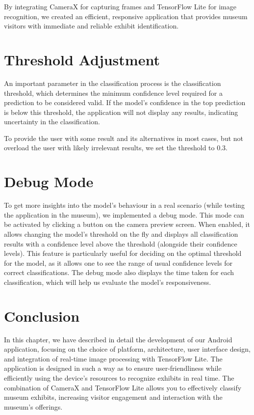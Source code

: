 By integrating CameraX for capturing frames and TensorFlow Lite for image recognition, we created an efficient, responsive application that provides museum visitors with immediate and reliable exhibit identification.

\section{Threshold Adjustment}

An important parameter in the classification process is the classification threshold, which determines the minimum confidence level required for a prediction to be considered valid. If the model's confidence in the top prediction is below this threshold, the application will not display any results, indicating uncertainty in the classification. 

To provide the user with some result and its alternatives in most cases, but not overload the user with likely irrelevant results, we set the threshold to 0.3.

\section{Debug Mode}

To get more insights into the model's behaviour in a real scenario (while testing the application in the museum), we implemented a debug mode. This mode can be activated by clicking a button on the camera preview screen. When enabled, it allows changing the model's threshold on the fly and displays all classification results with a confidence level above the threshold (alongside their confidence levels). This feature is particularly useful for deciding on the optimal threshold for the model, as it allows one to see the range of usual confidence levels for correct classifications. The debug mode also displays the time taken for each classification, which will help us evaluate the model's responsiveness.

\section{Conclusion}

In this chapter, we have described in detail the development of our Android application, focusing on the choice of platform, architecture, user interface design, and integration of real-time image processing with TensorFlow Lite. The application is designed in such a way as to ensure user-friendliness while efficiently using the device's resources to recognize exhibits in real time. The combination of CameraX and TensorFlow Lite allows you to effectively classify museum exhibits, increasing visitor engagement and interaction with the museum's offerings.